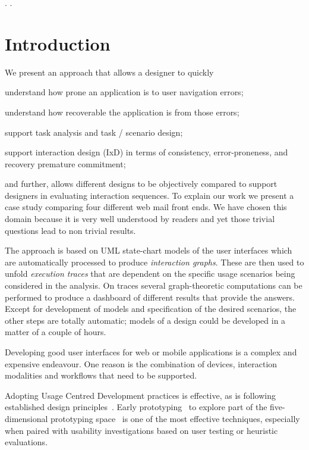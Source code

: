 \documentclass{sigchi}
\begin{document}
. 
. 

\section{Introduction}
We present an approach that allows a designer to quickly 
\begin{inparaenum}[(a)]
\item understand how prone an application is to user navigation errors;  
\item understand how recoverable the application is from those errors;
\item support task analysis and task / scenario design;
\item support interaction design (IxD) in terms of consistency, error-proneness, and recovery premature commitment;
\end{inparaenum}
and further, allows different designs to be objectively compared to support designers in evaluating interaction sequences. To explain our work we present a case study
comparing four different web mail front ends. We have chosen this
domain because it is very well understood by readers and yet those
trivial questions lead to non trivial results.

The approach is based on UML state-chart models of the user interfaces
which are automatically processed to produce \emph{interaction graphs}. These are then used to unfold \emph{execution traces} that
are dependent on the specific usage scenarios being considered in the
analysis. On traces several graph-theoretic computations can be
performed to produce a dashboard of different results that provide the
answers. Except for development of models and specification of the
desired scenarios, the other steps are totally automatic; models of a
design could be developed in a matter of a couple of hours.

Developing good user interfaces for web or mobile applications is a
complex and expensive endeavour. One reason is the combination of
devices, interaction modalities and workflows that need to be
supported.

Adopting Usage Centred Development practices is effective, as is
following established design principles~\cite{constantine99}. Early
prototyping~\cite{buxton07} to explore part of the five-dimensional
prototyping space~\cite{mccurdy06} is one of the most effective
techniques, especially when paired with usability investigations based
on user testing or heuristic evaluations.
\end{document}

